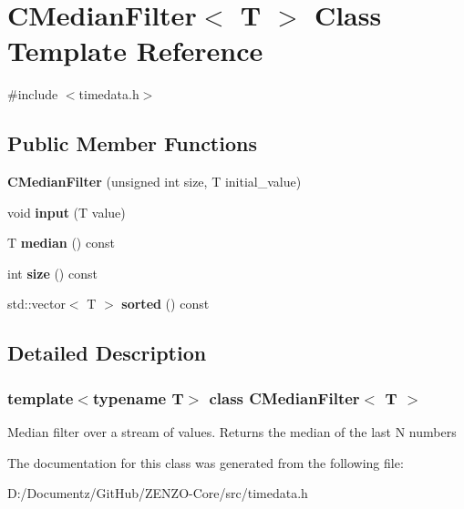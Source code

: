 \hypertarget{class_c_median_filter}{}\section{C\+Median\+Filter$<$ T $>$ Class Template Reference}
\label{class_c_median_filter}


{\ttfamily \#include $<$timedata.\+h$>$}

\subsection*{Public Member Functions}
\begin{DoxyCompactItemize}
\item 
\mbox{\label{class_c_median_filter_a181463ed081ece10fd437875243d9cad}} 
{\bfseries C\+Median\+Filter} (unsigned int size, T initial\+\_\+value)
\item 
\mbox{\label{class_c_median_filter_ae10cde98866b034ec73c530be4c60874}} 
void {\bfseries input} (T value)
\item 
\mbox{\label{class_c_median_filter_ade078740cdd0555adc2e52468d090c42}} 
T {\bfseries median} () const
\item 
\mbox{\label{class_c_median_filter_a618073c8aa8504670182d40d7084501c}} 
int {\bfseries size} () const
\item 
\mbox{\label{class_c_median_filter_a2ec3e6107c12dc2564f0323d39ecca1e}} 
std\+::vector$<$ T $>$ {\bfseries sorted} () const
\end{DoxyCompactItemize}


\subsection{Detailed Description}
\subsubsection*{template$<$typename T$>$\newline
class C\+Median\+Filter$<$ T $>$}

Median filter over a stream of values. Returns the median of the last N numbers 

The documentation for this class was generated from the following file\+:\begin{DoxyCompactItemize}
\item 
D\+:/\+Documentz/\+Git\+Hub/\+Z\+E\+N\+Z\+O-\/\+Core/src/timedata.\+h\end{DoxyCompactItemize}
